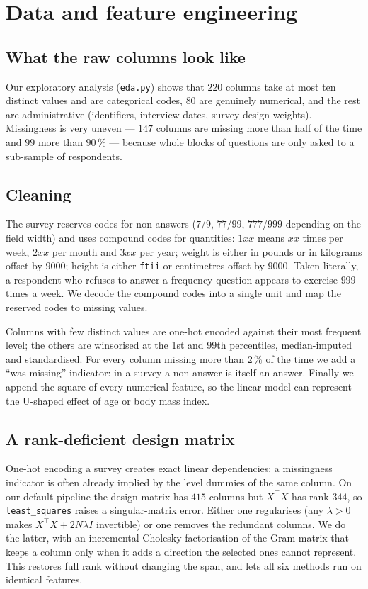 \documentclass[10pt,conference,compsocconf]{IEEEtran}
\begin{document}
\section{Data and feature engineering}

\subsection{What the raw columns look like}

Our exploratory analysis (\texttt{eda.py}) shows that $220$ columns take at
most ten distinct values and are categorical codes, $80$ are genuinely
numerical, and the rest are administrative (identifiers, interview dates,
survey design weights). Missingness is very uneven --- $147$ columns are
missing more than half of the time and $99$ more than $90\,\%$ --- because
whole blocks of questions are only asked to a sub-sample of respondents.

\subsection{Cleaning}

The survey reserves codes for non-answers ($7$/$9$, $77$/$99$, $777$/$999$
depending on the field width) and uses compound codes for quantities: $1xx$
means $xx$ times per week, $2xx$ per month and $3xx$ per year; weight is either
in pounds or in kilograms offset by $9000$; height is either \texttt{ftii} or
centimetres offset by $9000$. Taken literally, a respondent who refuses to
answer a frequency question appears to exercise $999$ times a week. We decode
the compound codes into a single unit and map the reserved codes to missing
values.

Columns with few distinct values are one-hot encoded against their most
frequent level; the others are winsorised at the 1st and 99th percentiles,
median-imputed and standardised. For every column missing more than $2\,\%$ of
the time we add a ``was missing'' indicator: in a survey a non-answer is itself
an answer. Finally we append the square of every numerical feature, so the
linear model can represent the U-shaped effect of age or body mass index.

\subsection{A rank-deficient design matrix}

One-hot encoding a survey creates exact linear dependencies: a missingness
indicator is often already implied by the level dummies of the same column. On
our default pipeline the design matrix has $415$ columns but $X^\top X$ has
rank $344$, so \texttt{least\_squares} raises a singular-matrix error. Either
one regularises (any $\lambda>0$ makes $X^\top X + 2N\lambda I$ invertible) or
one removes the redundant columns. We do the latter, with an incremental
Cholesky factorisation of the Gram matrix that keeps a column only when it adds
a direction the selected ones cannot represent. This restores full rank without
changing the span, and lets all six methods run on identical features.
\end{document}
